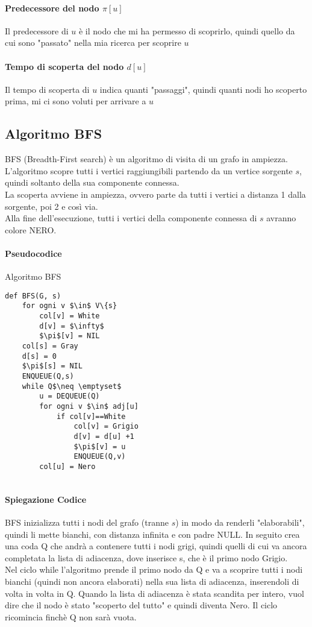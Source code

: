 \documentclass[12pt, a4paper, openany]{book}
\begin{document}
\paragraph{Predecessore del nodo $\pi[u]$}
Il predecessore di $u$ è il nodo che mi ha permesso di scoprirlo, quindi quello da cui sono "passato" nella mia ricerca per scoprire $u$
\paragraph{Tempo di scoperta del nodo $d[u]$}
Il tempo di scoperta di $u$ indica quanti "passaggi", quindi quanti nodi ho scoperto prima, mi ci sono voluti per arrivare a $u$

\subsection{Algoritmo BFS}
BFS (Breadth-First search) è un algoritmo di visita di un grafo in ampiezza.
\\L'algoritmo scopre tutti i vertici raggiungibili partendo da un vertice sorgente $s$, quindi soltanto della sua componente connessa.
\\La scoperta avviene in ampiezza, ovvero parte da tutti i vertici a distanza 1 dalla sorgente, poi 2 e così via.
\\Alla fine dell'esecuzione, tutti i vertici della componente connessa di $s$ avranno colore NERO.

\paragraph{Pseudocodice} Algoritmo BFS
\begin{lstlisting}
def BFS(G, s)
    for ogni v $\in$ V\{s}
        col[v] = White
        d[v] = $\infty$
        $\pi$[v] = NIL
    col[s] = Gray
    d[s] = 0
    $\pi$[s] = NIL
    ENQUEUE(Q,s)
    while Q$\neq \emptyset$
        u = DEQUEUE(Q)
        for ogni v $\in$ adj[u]
            if col[v]==White
                col[v] = Grigio
                d[v] = d[u] +1
                $\pi$[v] = u
                ENQUEUE(Q,v)
        col[u] = Nero
    
\end{lstlisting}
\paragraph{Spiegazione Codice}
BFS inizializza tutti i nodi del grafo (tranne $s$) in modo da renderli "elaborabili", quindi li mette bianchi, con distanza infinita e con padre NULL.
In seguito crea una coda Q che andrà a contenere tutti i nodi grigi, quindi quelli di cui va ancora completata la lista di adiacenza,
dove inserisce s, che è il primo nodo Grigio.
\\Nel ciclo while l'algoritmo prende il primo nodo da Q e va a scoprire tutti i nodi bianchi (quindi non ancora elaborati) nella sua lista di adiacenza, inserendoli di volta in volta in Q.
Quando la lista di adiacenza è stata scandita per intero, vuol dire che il nodo è stato "scoperto del tutto" e quindi diventa Nero.
Il ciclo ricomincia finchè Q non sarà vuota.
\end{document}

